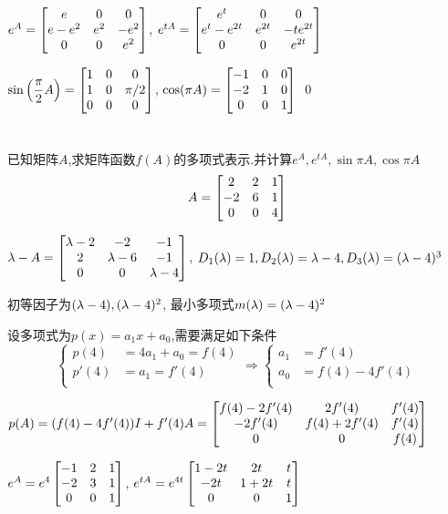 \documentclass{matrix-homework}
\begin{document}
$e^{A}=\begin{bmatrix}e&0&0\\e-e^2&e^2&-e^2\\0&0&e^2\end{bmatrix}$, $e^{tA}=\begin{bmatrix}e^t&0&0\\e^t-e^{2t}&e^{2t}&-te^{2t}\\0&0&e^{2t}\end{bmatrix}$

$\sin\left(\dfrac{\pi}{2}A\right)=\begin{bmatrix}1&0&0\\1&0&\pi/2\\0&0&0\end{bmatrix}$, $\cos(\pi A)=\begin{bmatrix}-1&0&0\\-2&1&0\\0&0&1\end{bmatrix}$
\qed


\section{}
已知矩阵$A$,求矩阵函数$f(A)$的多项式表示.并计算$e^A,e^{tA},\sin \pi A, \cos \pi A$
$$A=\begin{bmatrix}2&2&1\\-2&6&1\\0&0&4\end{bmatrix}$$

\answer
$\lambda-A=\begin{bmatrix}\lambda-2 & -2 & -1 \\ 2 &\lambda-6&-1\\0&0&\lambda-4\end{bmatrix}$, $D_1(\lambda)=1, D_2(\lambda)=\lambda-4, D_3(\lambda)=(\lambda-4)^3$

初等因子为$(\lambda-4),(\lambda-4)^2$, 最小多项式$m(\lambda)=(\lambda-4)^2$

设多项式为$p(x)=a_1 x+ a_0$,需要满足如下条件
\begin{equation*}
    \left\{
    \begin{aligned}
        p(4)  & = 4a_1+a_0 =f(4) \\
        p'(4) & = a_1 =f'(4)     \\
    \end{aligned}
    \right.
    \Rightarrow
    \left\{
    \begin{aligned}
        a_1 & = f'(4)       \\
        a_0 & =f(4) -4f'(4) \\
    \end{aligned}
    \right.
\end{equation*}

$p(A)=(f(4) -4f'(4) )I +  f'(4) A= \begin{bmatrix}f(4)-2f'(4)& 2f'(4) & f'(4) \\ -2f'(4) & f(4)+2f'(4) & f'(4) \\ 0 & 0 & f(4)\end{bmatrix} $

$e^{A}= e^4\begin{bmatrix}-1&2&1\\-2&3&1\\0&0&1\end{bmatrix}$,
$e^{tA}= e^{4t} \begin{bmatrix}1-2t&2t&t\\-2t&1+2t&t\\0&0&1\end{bmatrix}$
\end{document}

